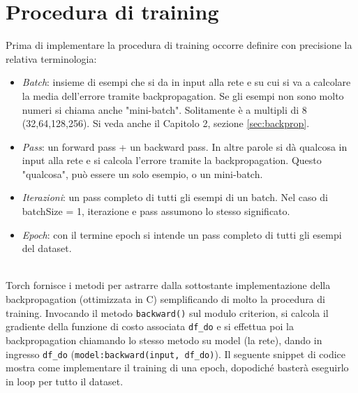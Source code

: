 \section{Procedura di training}
Prima di implementare la procedura di training occorre definire con precisione la relativa terminologia: 
\begin{itemize}
\item \emph{Batch}: insieme di esempi che si da in input alla rete e su cui si va a calcolare la media dell'errore tramite backpropagation. Se gli esempi non sono molto numeri si chiama anche "mini-batch". Solitamente è a multipli di 8 (32,64,128,256). Si veda anche il Capitolo 2, sezione \ref{sec:backprop}.
\item \emph{Pass}: un forward pass + un backward pass. In altre parole si dà qualcosa in input alla rete e si calcola l'errore tramite la backpropagation. Questo "qualcosa", può essere un solo esempio, o un mini-batch.
\item \emph{Iterazioni}: un pass completo di tutti gli esempi di un batch. Nel caso di batchSize = 1, iterazione e pass assumono lo stesso significato. 
\item \emph{Epoch}: con il termine epoch si intende un pass completo di tutti gli esempi del dataset.
\end{itemize}
\\
Torch fornisce i metodi per astrarre dalla sottostante implementazione della backpropagation (ottimizzata in C) semplificando di molto la procedura di training. Invocando il metodo \texttt{backward()} sul modulo criterion, si calcola il gradiente della funzione di costo associata \texttt{df\_do} e si effettua poi la backpropagation chiamando lo stesso metodo su model (la rete), dando in ingresso \texttt{df\_do} (\texttt{model:backward(input, df\_do)}). Il seguente snippet di codice mostra come implementare il training di una epoch, dopodiché basterà eseguirlo in loop per tutto il dataset. 

